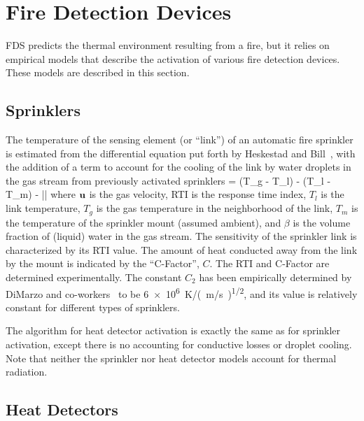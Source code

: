 

\chapter{Fire Detection Devices}

FDS predicts the thermal environment resulting from a fire, but it relies on empirical models that describe the activation of various fire detection devices. These models are described in this section.


\section{Sprinklers}

The temperature of the sensing element (or ``link'') of an automatic fire sprinkler is estimated from the differential equation put forth by Heskestad and Bill~\cite{Heskestad:3}, with the addition of a term to account for the cooling of the link by water droplets in the gas stream from previously activated sprinklers
\be {} =  (T_g - T_l) -
    (T_l - T_m) -  \beta |\bu|
   \label{actode}
\ee
where ${\mathbf{u}}$ is the gas velocity, RTI is the response time index, $T_l$ is the link temperature, $T_g$ is the gas temperature in the neighborhood of the link, $T_m$ is the temperature of the sprinkler mount (assumed ambient), and $\beta$ is the volume fraction of (liquid) water in the gas stream. The sensitivity of the sprinkler link is characterized by its RTI value. The amount of heat conducted away from the link by the mount is indicated by the ``C-Factor'', $C$. The RTI and C-Factor are determined experimentally. The constant $C_2$ has been empirically determined by DiMarzo and co-workers~\cite{Ruffino:1,Ruffino:2,Gavelli:1} to be \SI{6e6}{K/(m/s)^{1/2}}, and its value is relatively constant for different types of sprinklers.

The algorithm for heat detector activation is exactly the same as for sprinkler activation, except there is no accounting for conductive losses or droplet cooling. Note that neither the sprinkler nor heat detector models account for thermal radiation.

\section{Heat Detectors}

